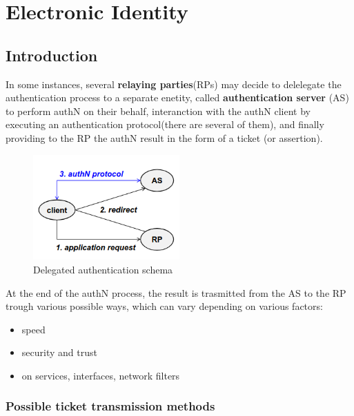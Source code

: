 \chapter{Electronic Identity}

\section{Introduction}
In some instances, several \textbf{relaying parties}(RPs) may decide
to delelegate the authentication process to a separate enetity,
called \textbf{authentication server} (AS) to perform authN on their
behalf, interanction with the authN client by executing an
authentication protocol(there are several of them), and finally
providing to the RP the authN result in the form of a ticket (or
assertion).

\begin{figure}[H]
  \centering
  \includegraphics[width=0.5\textwidth]{img/delegated auth.png}
  \caption{Delegated authentication schema}
\end{figure}

At the end of the authN process, the result is trasmitted from the AS
to the RP trough various possible ways, which can vary depending on
various factors:
\begin{itemize}
  \item speed
  \item security and trust
  \item on services, interfaces, network filters
\end{itemize}

\subsection{Possible ticket transmission methods}

